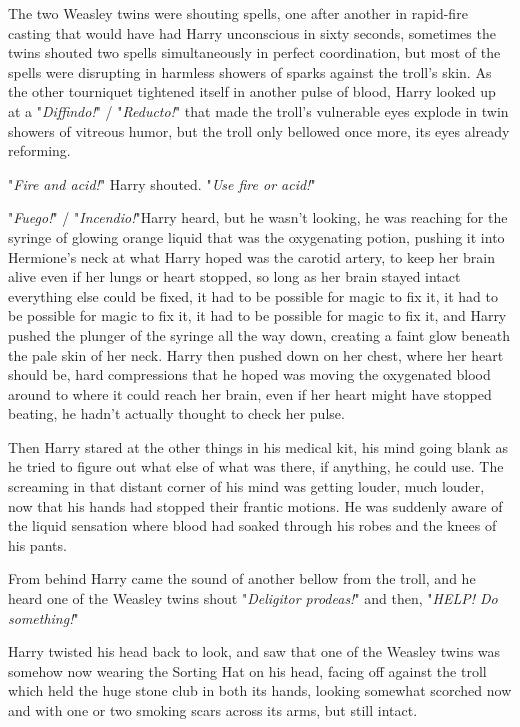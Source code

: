 The two Weasley twins were shouting spells, one after another in rapid-fire
casting that would have had Harry unconscious in sixty seconds, sometimes the
twins shouted two spells simultaneously in perfect coordination, but most of
the spells were disrupting in harmless showers of sparks against the troll's
skin. As the other tourniquet tightened itself in another pulse of blood, Harry
looked up at a "\emph{Diffindo!}" / "\emph{Reducto!}" that made the troll's vulnerable
eyes explode in twin showers of vitreous humor, but the troll only bellowed
once more, its eyes already reforming.

"\emph{Fire and acid!}" Harry shouted. "\emph{Use fire or acid!}"

"\emph{Fuego!}" / "\emph{Incendio!}"Harry heard, but he wasn't looking, he was
reaching for the syringe of glowing orange liquid that was the oxygenating
potion, pushing it into Hermione's neck at what Harry hoped was the carotid
artery, to keep her brain alive even if her lungs or heart stopped, so long as
her brain stayed intact everything else could be fixed, it had to be possible
for magic to fix it, it had to be possible for magic to fix it, it had to be
possible for magic to fix it, and Harry pushed the plunger of the syringe all
the way down, creating a faint glow beneath the pale skin of her neck. Harry
then pushed down on her chest, where her heart should be, hard compressions
that he hoped was moving the oxygenated blood around to where it could reach
her brain, even if her heart might have stopped beating, he hadn't actually
thought to check her pulse.

Then Harry stared at the other things in his medical kit, his mind going blank
as he tried to figure out what else of what was there, if anything, he could
use. The screaming in that distant corner of his mind was getting louder, much
louder, now that his hands had stopped their frantic motions. He was suddenly
aware of the liquid sensation where blood had soaked through his robes and the
knees of his pants.

From behind Harry came the sound of another bellow from the troll, and he heard
one of the Weasley twins shout "\emph{Deligitor prodeas!}" and then,
"\emph{HELP! Do something!}"

Harry twisted his head back to look, and saw that one of the Weasley twins was
somehow now wearing the Sorting Hat on his head, facing off against the troll
which held the huge stone club in both its hands, looking somewhat scorched now
and with one or two smoking scars across its arms, but still intact.

